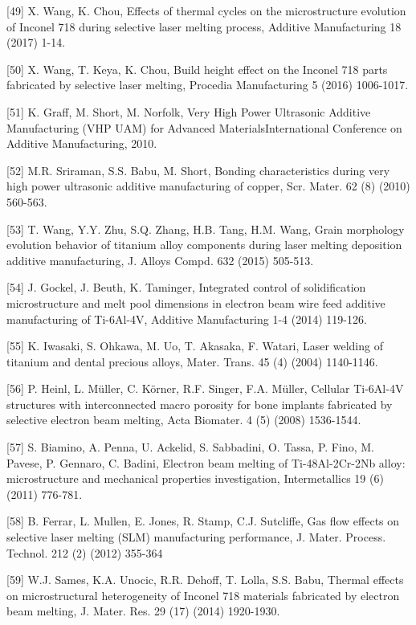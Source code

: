 \documentclass[10pt]{article}
\begin{document}
[49] X. Wang, K. Chou, Effects of thermal cycles on the microstructure evolution of Inconel 718 during selective laser melting process, Additive Manufacturing 18 (2017) 1-14.

[50] X. Wang, T. Keya, K. Chou, Build height effect on the Inconel 718 parts fabricated by selective laser melting, Procedia Manufacturing 5 (2016) 1006-1017.

[51] K. Graff, M. Short, M. Norfolk, Very High Power Ultrasonic Additive Manufacturing (VHP UAM) for Advanced MaterialsInternational Conference on Additive Manufacturing, 2010.

[52] M.R. Sriraman, S.S. Babu, M. Short, Bonding characteristics during very high power ultrasonic additive manufacturing of copper, Scr. Mater. 62 (8) (2010) 560-563.

[53] T. Wang, Y.Y. Zhu, S.Q. Zhang, H.B. Tang, H.M. Wang, Grain morphology evolution behavior of titanium alloy components during laser melting deposition additive manufacturing, J. Alloys Compd. 632 (2015) 505-513.

[54] J. Gockel, J. Beuth, K. Taminger, Integrated control of solidification microstructure and melt pool dimensions in electron beam wire feed additive manufacturing of Ti-6Al-4V, Additive Manufacturing 1-4 (2014) 119-126.

[55] K. Iwasaki, S. Ohkawa, M. Uo, T. Akasaka, F. Watari, Laser welding of titanium and dental precious alloys, Mater. Trans. 45 (4) (2004) 1140-1146.

[56] P. Heinl, L. Müller, C. Körner, R.F. Singer, F.A. Müller, Cellular Ti-6Al-4V structures with interconnected macro porosity for bone implants fabricated by selective electron beam melting, Acta Biomater. 4 (5) (2008) 1536-1544.

[57] S. Biamino, A. Penna, U. Ackelid, S. Sabbadini, O. Tassa, P. Fino, M. Pavese, P. Gennaro, C. Badini, Electron beam melting of Ti-48Al-2Cr-2Nb alloy: microstructure and mechanical properties investigation, Intermetallics 19 (6) (2011) 776-781.

[58] B. Ferrar, L. Mullen, E. Jones, R. Stamp, C.J. Sutcliffe, Gas flow effects on selective laser melting (SLM) manufacturing performance, J. Mater. Process. Technol. 212 (2) (2012) 355-364

[59] W.J. Sames, K.A. Unocic, R.R. Dehoff, T. Lolla, S.S. Babu, Thermal effects on microstructural heterogeneity of Inconel 718 materials fabricated by electron beam melting, J. Mater. Res. 29 (17) (2014) 1920-1930.
\end{document}
